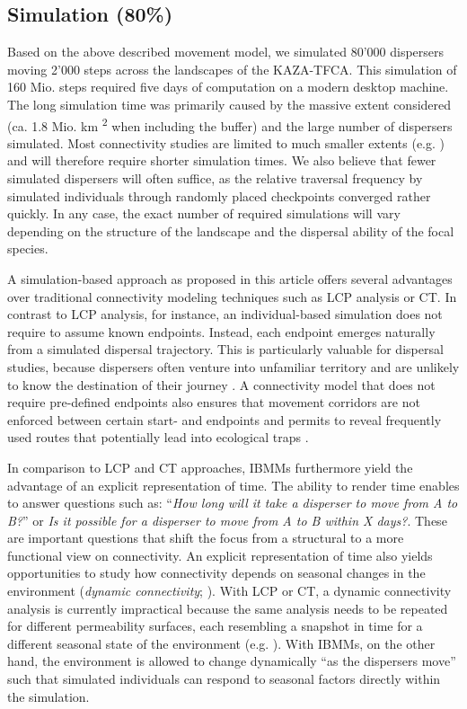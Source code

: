 \documentclass[abstract=on,10pt,a4paper,bibliography=totocnumbered]{article}
\begin{document}
\subsection{Simulation (80\%)}
Based on the above described movement model, we simulated 80'000 dispersers
moving 2'000 steps across the landscapes of the KAZA-TFCA. This simulation of
160 Mio. steps required five days of computation on a modern desktop machine.
The long simulation time was primarily caused by the massive extent considered
(ca. 1.8 Mio. km \textsuperscript{2} when including the buffer) and the large
number of dispersers simulated. Most connectivity studies are limited to much
smaller extents (e.g. \citealp{Kanagaraj.2013, Clark.2015, McClure.2016,
Abrahms.2017, Zeller.2020}) and will therefore require shorter simulation times.
We also believe that fewer simulated dispersers will often suffice, as the
relative traversal frequency by simulated individuals through randomly placed
checkpoints converged rather quickly. In any case, the exact number of required
simulations will vary depending on the structure of the landscape and the
dispersal ability of the focal species.

A simulation-based approach as proposed in this article offers several
advantages over traditional connectivity modeling techniques such as LCP
analysis or CT. In contrast to LCP analysis, for instance, an individual-based
simulation does not require to assume known endpoints. Instead, each endpoint
emerges naturally from a simulated dispersal trajectory. This is particularly
valuable for dispersal studies, because dispersers often venture into unfamiliar
territory and are unlikely to know the destination of their journey
\citep{Elliot.2014, Abrahms.2017, Cozzi.2020}. A connectivity model that does
not require pre-defined endpoints also ensures that movement corridors are not
enforced between certain start- and endpoints and permits to reveal frequently
used routes that potentially lead into ecological traps \citep{Dwernychuk.1972,
VanDerMeer.2014}.

In comparison to LCP and CT approaches, IBMMs furthermore yield the advantage of
an explicit representation of time. The ability to render time enables to answer
questions such as: ``\textit{How long will it take a disperser to move from A to
B?}'' or \textit{Is it possible for a disperser to move from A to B within X
days?}. These are important questions that shift the focus from a structural to
a more functional view on connectivity. An explicit representation of time also
yields opportunities to study how connectivity depends on seasonal changes in
the environment (\textit{dynamic connectivity}; \citealp{Zeller.2020}). With LCP
or CT, a dynamic connectivity analysis is currently impractical because the same
analysis needs to be repeated for different permeability surfaces, each
resembling a snapshot in time for a different seasonal state of the environment
(e.g. \citealp{Benz.2016, Osipova.2019}). With IBMMs, on the other hand, the
environment is allowed to change dynamically ``as the dispersers move'' such
that simulated individuals can respond to seasonal factors directly within the
simulation.
\end{document}
